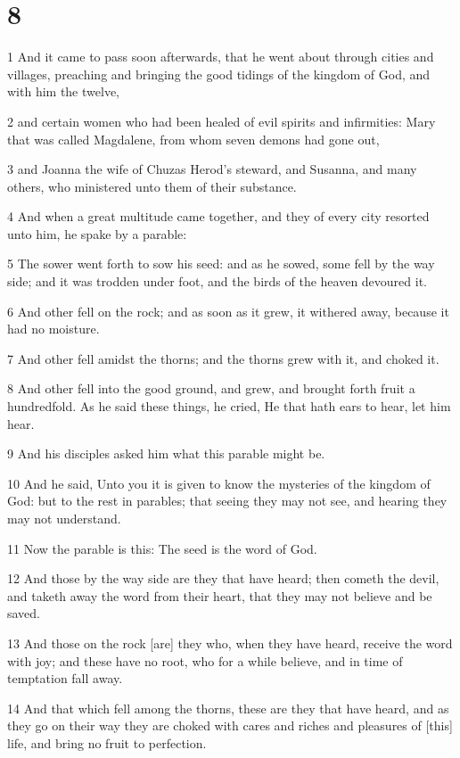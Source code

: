\chapter{8}

\par 1 And it came to pass soon afterwards, that he went about through cities and villages, preaching and bringing the good tidings of the kingdom of God, and with him the twelve,
\par 2 and certain women who had been healed of evil spirits and infirmities: Mary that was called Magdalene, from whom seven demons had gone out,
\par 3 and Joanna the wife of Chuzas Herod's steward, and Susanna, and many others, who ministered unto them of their substance.
\par 4 And when a great multitude came together, and they of every city resorted unto him, he spake by a parable:
\par 5 The sower went forth to sow his seed: and as he sowed, some fell by the way side; and it was trodden under foot, and the birds of the heaven devoured it.
\par 6 And other fell on the rock; and as soon as it grew, it withered away, because it had no moisture.
\par 7 And other fell amidst the thorns; and the thorns grew with it, and choked it.
\par 8 And other fell into the good ground, and grew, and brought forth fruit a hundredfold. As he said these things, he cried, He that hath ears to hear, let him hear.
\par 9 And his disciples asked him what this parable might be.
\par 10 And he said, Unto you it is given to know the mysteries of the kingdom of God: but to the rest in parables; that seeing they may not see, and hearing they may not understand.
\par 11 Now the parable is this: The seed is the word of God.
\par 12 And those by the way side are they that have heard; then cometh the devil, and taketh away the word from their heart, that they may not believe and be saved.
\par 13 And those on the rock [are] they who, when they have heard, receive the word with joy; and these have no root, who for a while believe, and in time of temptation fall away.
\par 14 And that which fell among the thorns, these are they that have heard, and as they go on their way they are choked with cares and riches and pleasures of [this] life, and bring no fruit to perfection.
